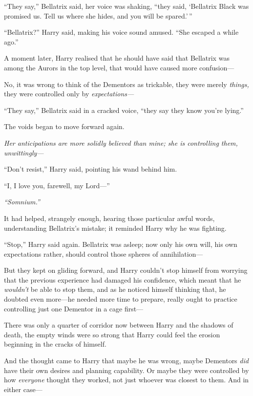 ``They say,'' Bellatrix said, her voice was shaking, ``they said,
`Bellatrix Black was promised us. Tell us where she hides, and you will
be spared.'\,''

``Bellatrix?'' Harry said, making his voice sound amused. ``She escaped
a while ago.''

A moment later, Harry realised that he should have said that Bellatrix
was among the Aurors in the top level, that would have caused more
confusion---

No, it was wrong to think of the Dementors as trickable, they were
merely \emph{things,} they were controlled only by
\emph{expectations---}

``They say,'' Bellatrix said in a cracked voice, ``they say they know
you're lying.''

The voids began to move forward again.

\emph{Her anticipations are more solidly believed than mine; she is
controlling them, unwittingly---}

``Don't resist,'' Harry said, pointing his wand behind him.

``I, I love you, farewell, my Lord---''

\emph{``Somnium.''}

It had helped, strangely enough, hearing those particular awful words,
understanding Bellatrix's mistake; it reminded Harry why he was
fighting.

``Stop,'' Harry said again. Bellatrix was asleep; now only his own will,
his own expectations rather, should control those spheres of
annihilation---

But they kept on gliding forward, and Harry couldn't stop himself from
worrying that the previous experience had damaged his confidence, which
meant that he \emph{wouldn't} be able to stop them, and as he noticed
himself thinking that, he doubted even more---he needed more time to
prepare, really ought to practice controlling just one Dementor in a
cage first---

There was only a quarter of corridor now between Harry and the shadows
of death, the empty winds were so strong that Harry could feel the
erosion beginning in the cracks of himself.

And the thought came to Harry that maybe he was wrong, maybe Dementors
\emph{did} have their own desires and planning capability. Or maybe they
were controlled by how \emph{everyone} thought they worked, not just
whoever was closest to them. And in either case---


